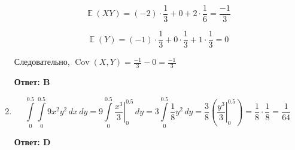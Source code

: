 \documentclass[112pt, cmcyralt]{article}
\DeclareMathOperator{\Cov}{Cov}
\DeclareMathOperator{\E}{\mathbb{E}}
\begin{document}
\begin{enumerate}
\[
\E(XY) = (-2)\cdot\frac{1}{3} + 0 + 2\cdot\frac{1}{6}  = \frac{-1}{3}
\]

\[
\E(Y) = (-1)\cdot\frac{1}{3}+ 0\cdot\frac{1}{3}+ 1\cdot\frac{1}{3}= 0
\]

Следовательно, $\Cov(X, Y) = \frac{-1}{3} - 0 = \frac{-1}{3}$

\textbf{Ответ: B}


\item

\[
\int\limits_{0}^{0.5} {\int\limits_{0}^{0.5} 9x^2y^2\,dx}\,dy=9\int\limits_{0}^{0.5} \left.\frac{x^3}{3}\right|_0^{0.5} \,dy=3\int\limits_{0}^{0.5} \frac{1}{8}y^2 \,dy=\frac{3}{8}(\left.\frac{y^3}{3}\right|_0^{0.5})=\frac{1}{8}\cdot\frac{1}{8}=\frac{1}{64}
\]

\textbf{Ответ: D}
\end{enumerate}
\end{document}
